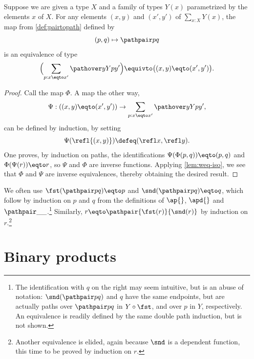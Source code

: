 \begin{lemma}\label{lem:isEq-pair=}
  Suppose we are given a type $X$ and a family of types $Y(x)$ parametrized by the elements $x$ of $X$.
  For any elements $(x,y)$ and $(x',y')$ of $\sum _{x:X} Y(x)$,
  the map from \cref{def:pairtopath} defined by
  \[
    (p,q) \mapsto \pathpair p q
  \]
  is an equivalence of type
  \[
    \Bigl( \sum_{p:x \eqto x'} \pathover y Y p {y'} \Bigr)
    \equivto \bigl( (x,y) \eqto (x',y') \bigr).
  \]
\end{lemma}

\begin{proof}
  Call the map $\Phi$.
  A map the other way,
  \[
    \Psi : ((x,y) \eqto (x',y')) \to \sum_{p:x \eqto x'} \pathover y Y p {y'},
  \]
  can be defined by induction, by setting
  \[
    \Psi (\refl {(x,y)}) \defeq (\refl x, \refl y).
  \]
  One proves, by induction on paths, the identifications $ \Psi ( \Phi (p,q) ) \eqto (p,q) $ and $ \Phi (\Psi ( r )) \eqto r$, so $\Psi$ and $\Phi$ are inverse functions.
  Applying \cref{lem:weq-iso}, we see that $\Phi$ and $\Psi$ are inverse equivalences, thereby obtaining the desired result.
\end{proof}

We often use $\fst(\pathpair p q) \eqto p$ and $\snd(\pathpair p q) \eqto q$,
which follow by induction on $p$ and $q$ from the definitions of $\ap{}$, $\apd{}$ and 
$\pathpair \_ \_$.\footnote{%
The identification with $q$ on the right may seem intuitive, but is an abuse of notation:
$\snd(\pathpair p q)$ and $q$ have the same endpoints, but are actually paths 
over $\pathpair p q$ in $Y\circ\fst$, and over $p$ in $Y$, respectively. 
An equivalence is readily defined by the same double path induction, but is not shown.
}
Similarly, $r \eqto \pathpair {\fst(r)}{\snd(r)}$ by induction on $r$.\footnote{%
Another equivalence is elided, again because $\snd$ is a dependent function, 
this time to be proved by induction on $r$.
}

\section{Binary products}
\label{sec:binprod-types}

